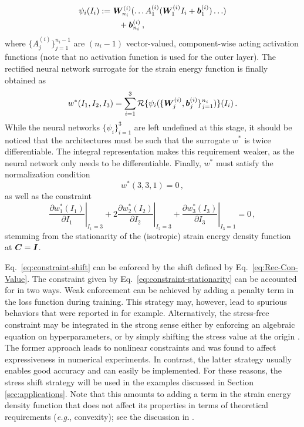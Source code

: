 \begin{align}
     \psi_i(I_i) := & ~ \boldsymbol{W}_{n_i}^{(i)}(\ldots A_1^{(i)}(\boldsymbol{W}_1^{(i)} I_i + \boldsymbol{b}_1^{(i)}) \ldots) \nonumber \\
     & \quad + \boldsymbol{b}_{n_i}^{(i)}\,,
\end{align}
where $\{A_j^{(i)}\}_{j=1}^{n_i-1}$ are $(n_i-1)$ vector-valued, component-wise acting activation functions (note that no activation function is used for the outer layer). The rectified neural network surrogate for the strain energy function is finally obtained as
\begin{equation}
    w^*(I_1,I_2,I_3) = \sum_{i = 1}^{3} \mathcal{R}\{\psi_i(\{\boldsymbol{W}_j^{(i)}, \boldsymbol{b}_j^{(i)}\}_{j = 1}^{n_i})\}(I_i)\,. 
\end{equation}
While the neural networks $\{\psi_i\}_{i = 1}^3$ are left undefined at this stage, it should be noticed that the architectures must be such that the surrogate $w^*$ is twice differentiable. The integral representation makes this requirement weaker, as the neural network only needs to be differentiable. 
Finally, $w^*$ must satisfy the normalization condition 
\begin{equation}\label{eq:constraint-shift}
    w^*(3, 3, 1) = 0\,,
\end{equation}
as well as the constraint
\begin{equation}\label{eq:constraint-stationarity}
    \left.\frac{\partial w_1^*(I_1)}{\partial I_1}\right\vert_{I_1 = 3} + \left.2\frac{\partial w_2^*(I_2)}{\partial I_2}\right\vert_{I_2 = 3} + \left.\frac{\partial w_3^*(I_3)}{\partial I_3}\right\vert_{I_3 = 1} = 0\,,
\end{equation}
stemming from the stationarity of the (isotropic) strain energy density function at $\boldsymbol{C} = \boldsymbol{I}$. 

Eq.~\eqref{eq:constraint-shift} can be enforced by the shift defined by Eq.~\eqref{eq:Rec-Con-Value}. The constraint given by Eq.~\eqref{eq:constraint-stationarity}  can be accounted for in two ways. Weak enforcement can be achieved by adding a penalty term in the loss function during training. This strategy may, however, lead to spurious behaviors that were reported in \cite{Asad-IJNME} for example. Alternatively, the stress-free constraint may be integrated in the strong sense either by enforcing an algebraic equation on hyperparameters, or by simply shifting the stress value at the origin \cite{Asad-IJNME}. The former approach leads to nonlinear constraints and was found to affect expressiveness in numerical experiments. In contrast, the latter strategy usually enables good accuracy and can easily be implemented. For these reasons, the stress shift strategy will be used in the examples discussed in Section \ref{sec:applications}. Note that this amounts to adding a term in the strain energy density function that does not affect its properties in terms of theoretical requirements (\textit{e.g.}, convexity); see the discussion in \cite{Asad-IJNME}.

